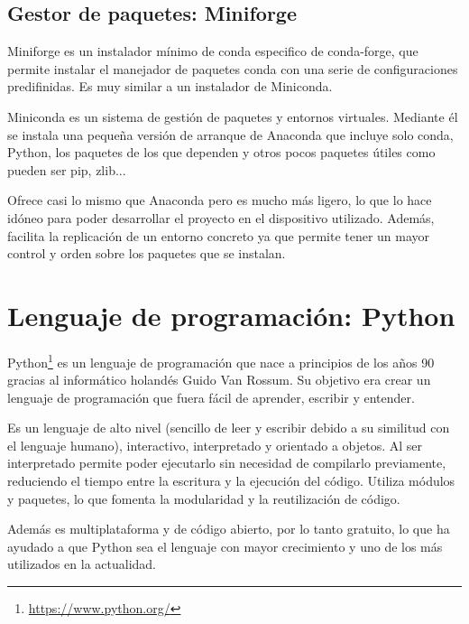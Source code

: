 \documentclass[a4paper, 12pt]{book}
\begin{document}
\subsection{Gestor de paquetes: Miniforge}
\label{subsec:gestor_de_paquetes}


Miniforge es un instalador mínimo de conda especifico de conda-forge, que permite instalar el manejador de paquetes conda con una serie de configuraciones predifinidas. Es muy similar a un instalador de Miniconda.

Miniconda es un sistema de gestión de paquetes y entornos virtuales. Mediante él se instala una pequeña versión de arranque de Anaconda que incluye solo conda, Python, los paquetes de los que dependen y otros pocos paquetes útiles como pueden ser pip, zlib...

Ofrece casi lo mismo que Anaconda pero es mucho más ligero, lo que lo hace idóneo para poder desarrollar el proyecto en el dispositivo utilizado. Además, facilita la replicación de un entorno concreto ya que permite tener un mayor control y orden sobre los paquetes que se instalan. 

\section{Lenguaje de programación: Python}
\label{sec:lenguaje_de_programación}

Python\footnote{\url{https://www.python.org/}} es un lenguaje de programación que nace a principios de los años 90 gracias al informático holandés Guido Van Rossum. Su objetivo era crear un lenguaje de programación que fuera fácil de aprender, escribir y entender.

Es un lenguaje de alto nivel (sencillo de leer y escribir debido a su similitud con el lenguaje humano), interactivo, interpretado y orientado a objetos. Al ser interpretado permite poder ejecutarlo sin necesidad de compilarlo previamente, reduciendo el tiempo entre la escritura y la ejecución del código. Utiliza módulos y paquetes, lo que fomenta la modularidad y la reutilización de código. 

Además es multiplataforma y de código abierto, por lo tanto gratuito, lo que ha ayudado a que Python sea el lenguaje con mayor crecimiento y uno de los más utilizados en la actualidad.  
\end{document}
